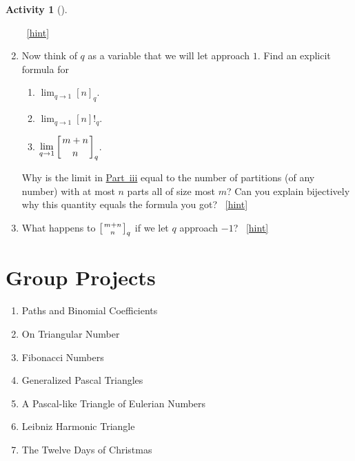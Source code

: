 \documentclass[10pt,]{book}
\theoremstyle{plain}
\theoremstyle{definition}
\theoremstyle{definition}
\theoremstyle{definition}
\newtheorem{activity}[project]{Activity}
\numberwithin{equation}{chapter}
\newcommand{\qchoose}[2]{\left[{#1\atop#2}\right]_q}
\begin{document}
\begin{activity}[]
\begin{enumerate}[font=\bfseries,label=(\alph*),ref=\alph*]
\begin{equation*}
\end{equation*}
%
~\hfill{\tiny\hyperlink{a-327.f}{[hint]}\hypertarget{q-327.f}{}}\item\label{task-290} \hypertarget{p-1642}{}%
Now think of \(q\) as a variable that we will let approach \(1\). Find an explicit formula for \leavevmode%
\begin{enumerate}[label=(\roman*)]
\item\hypertarget{li-62}{}\(\displaystyle\lim_{q\rightarrow 1} [n]_q\).%
\item\hypertarget{li-63}{}\(\displaystyle\lim_{q\rightarrow 1} [n]!_q\).%
\item\hypertarget{q-binomial-lim}{}\(\displaystyle\lim_{q\rightarrow 1} \qchoose{m+n}{n}\).%
\end{enumerate}
 Why is the limit in \hyperlink{q-binomial-lim}{Part~iii} equal to the number of partitions (of any number) with at most \(n\) parts all of size most \(m\)? Can you explain bijectively why this quantity equals the formula you got?%
~\hfill{\tiny\hyperlink{a-327.g}{[hint]}\hypertarget{q-327.g}{}}\item\label{task-291} \hypertarget{p-1645}{}%
What happens to \(\qchoose{m+n}{n}\) if we let \(q\) approach \(-1\)?%
~\hfill{\tiny\hyperlink{a-327.h}{[hint]}\hypertarget{q-327.h}{}}\end{enumerate}
\end{activity}
%
%
%
\appendix
%
\typeout{************************************************}
\typeout{************************************************}
\chapter[{Group Projects}]{Group Projects}\label{app_projects}
\hypertarget{p-1653}{}%
\leavevmode%
\begin{enumerate}
\item\hypertarget{li-68}{}Paths and Binomial Coefficients%
\item\hypertarget{li-69}{}On Triangular Number%
\item\hypertarget{li-70}{}Fibonacci Numbers%
\item\hypertarget{li-71}{}Generalized Pascal Triangles%
\item\hypertarget{li-72}{}A Pascal-like Triangle of Eulerian Numbers%
\item\hypertarget{li-73}{}Leibniz Harmonic Triangle%
\item\hypertarget{li-74}{}The Twelve Days of Christmas%
\end{enumerate}
%
\typeout{************************************************}
\typeout{************************************************}
\end{document}
